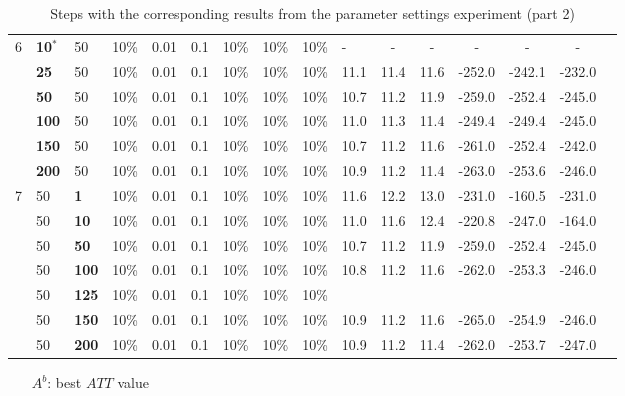 \begin{sidewaystable}
\begin{tabular}{|l|l|l|l|l|l|l|l|l|l||c|c|c|c|c|c|}
    \hline
    6 & \textbf{10$^*$} & 50 & 10\% & 0.01 & 0.1 & 10\% & 10\% & 10\% & - & - & - & - & - & - \\
    ~ & \textbf{25} & 50 & 10\% & 0.01 & 0.1 & 10\% & 10\% & 10\% & 11.1 & 11.4 & 11.6 & -252.0 & -242.1 & -232.0 \\
    ~ & \textbf{50} & 50 & 10\% & 0.01 & 0.1 & 10\% & 10\% & 10\% & 10.7 & 11.2 & 11.9 & -259.0 & -252.4 & -245.0 \\
    ~ & \textbf{100} & 50 & 10\% & 0.01 & 0.1 & 10\% & 10\% & 10\% & 11.0 & 11.3 & 11.4 & -249.4 & -249.4 & -245.0 \\
    ~ & \textbf{150} & 50 & 10\% & 0.01 & 0.1 & 10\% & 10\% & 10\% & 10.7 & 11.2 & 11.6 & -261.0 & -252.4 & -242.0 \\
    ~ & \textbf{200} & 50 & 10\% & 0.01 & 0.1 & 10\% & 10\% & 10\% & 10.9 & 11.2 & 11.4 & -263.0 & -253.6 & -246.0 \\
    \hline
    7 & 50 & \textbf{1} & 10\% & 0.01 & 0.1 & 10\% & 10\% & 10\% & 11.6 & 12.2 & 13.0 & -231.0 & -160.5 & -231.0  \\
    ~ & 50 & \textbf{10} & 10\% & 0.01 & 0.1 & 10\% & 10\% & 10\% & 11.0 & 11.6 & 12.4 & -220.8 & -247.0 & -164.0  \\
    ~ & 50 & \textbf{50} & 10\% & 0.01 & 0.1 & 10\% & 10\% & 10\% & 10.7 & 11.2 & 11.9 & -259.0 & -252.4 & -245.0 \\
    ~ & 50 & \textbf{100} & 10\% & 0.01 & 0.1 & 10\% & 10\% & 10\% & 10.8 & 11.2 & 11.6 & -262.0 & -253.3 & -246.0  \\
    ~ & 50 & \textbf{125} & 10\% & 0.01 & 0.1 & 10\% & 10\% & 10\% &  & ~ & ~ & ~ & ~ & ~  \\
    ~ & 50 & \textbf{150} & 10\% & 0.01 & 0.1 & 10\% & 10\% & 10\% & 10.9 & 11.2 & 11.6 & -265.0 & -254.9 & -246.0  \\
    ~ & 50 & \textbf{200} & 10\% & 0.01 & 0.1 & 10\% & 10\% & 10\% & 10.9 & 11.2 & 11.4 & -262.0 & -253.7 & -247.0  \\
    \hline
    \end{tabular}
    \caption {Steps with the corresponding results from the parameter settings experiment (part 2)}
    \tiny
    \begin{itemize}[noitemsep]
    \item[$A^b$:] best $ATT$ value

\end{itemize}
\end{sidewaystable}

